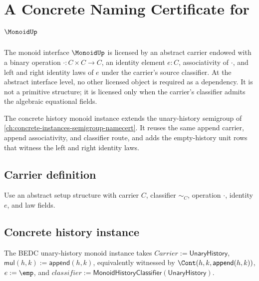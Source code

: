 \chapter{A Concrete Naming Certificate for \(\MonoidUp\)}
\label{ch:concrete-instances-monoid-namecert}

The monoid interface \(\MonoidUp\) is licensed by an abstract carrier endowed with a binary operation \(\cdot : C \times C \to C\), an identity element \(e : C\), associativity of \(\cdot\), and left and right identity laws of \(e\) under the carrier's source classifier. At the abstract interface level, no other licensed object is required as a dependency. It is not a primitive structure; it is licensed only when the carrier's classifier admits the algebraic equational fields.

The concrete history monoid instance extends the unary-history semigroup of \autoref{ch:concrete-instances-semigroup-namecert}. It reuses the same append carrier, append associativity, and classifier route, and adds the empty-history unit rows that witness the left and right identity laws.

\section{Carrier definition}

\begin{definition}
\label{def:monoid-carrier}
Use an abstract setup structure with carrier \(C\), classifier \(\sim_C\), operation \(\cdot\), identity \(e\), and law fields.
\end{definition}

\section{Concrete history instance}
\label{sec:monoid-concrete-history-instance}

\begin{definition}
\label{def:concrete-history-monoid-instance}
The BEDC unary-history monoid instance takes $Carrier := \mathsf{UnaryHistory}$,
$\mathsf{mul}(h,k) := \mathsf{append}(h,k)$, equivalently witnessed by
$\Cont(h,k,\mathsf{append}(h,k))$, $e := \emp$, and
$classifier := \mathsf{MonoidHistoryClassifier}(\mathsf{UnaryHistory})$.
\end{definition}

